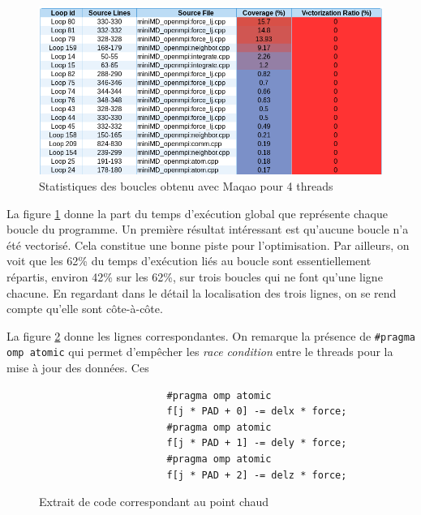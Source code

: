 \documentclass[11pt,a4paper]{article}
\begin{document}
			\begin{figure}[h!]
				\begin{center}
					\includegraphics[width=500px]{images/maqao_loops.png}
					\caption{Statistiques des boucles obtenu avec Maqao pour 4 threads}
					\label{loop_maqao}
				\end{center}
			\end{figure}

			La figure \ref{loop_maqao} donne la part du temps d'exécution global que représente chaque boucle du programme. Un première résultat intéressant est qu'aucune boucle n'a été vectorisé. Cela constitue une bonne piste pour l'optimisation. Par ailleurs, on voit que les 62\% du temps d'exécution liés au boucle sont essentiellement répartis, environ 42\% sur les 62\%, sur trois boucles qui ne font qu'une ligne chacune. En regardant dans le détail la localisation des trois lignes, on se rend compte qu'elle sont côte-à-côte.

			La figure \ref{code:hotspot} donne les lignes correspondantes. On remarque la présence de \verb!#pragma omp atomic! qui permet d'empêcher les \textit{race condition} entre le threads pour la mise à jour des données. Ces 

			\begin{figure}[h!]
				\caption{Extrait de code correspondant au point chaud}
				\label{code:hotspot}
				\begin{verbatim}
					  #pragma omp atomic
					  f[j * PAD + 0] -= delx * force;
					  #pragma omp atomic
					  f[j * PAD + 1] -= dely * force;
					  #pragma omp atomic
					  f[j * PAD + 2] -= delz * force;
				\end{verbatim}
			\end{figure}
\end{document}
